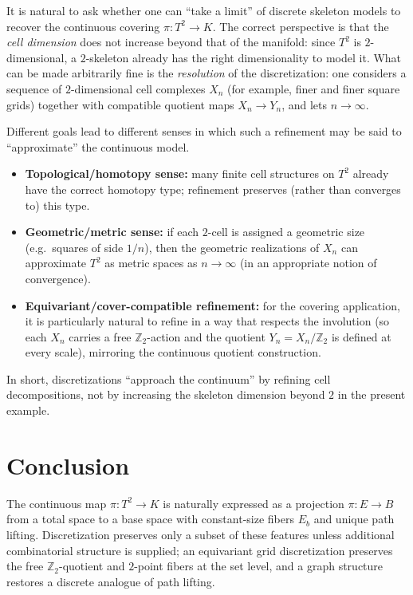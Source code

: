 \documentclass[11pt,a4paper]{article}
\theoremstyle{definition}
\theoremstyle{remark}
\begin{document}
It is natural to ask whether one can ``take a limit'' of discrete skeleton models to recover the continuous covering \(\pi:T^2\to K\). The correct perspective is that the \emph{cell dimension} does not increase beyond that of the manifold: since \(T^2\) is \(2\)-dimensional, a \(2\)-skeleton already has the right dimensionality to model it. What can be made arbitrarily fine is the \emph{resolution} of the discretization: one considers a sequence of \(2\)-dimensional cell complexes \(X_n\) (for example, finer and finer square grids) together with compatible quotient maps \(X_n\to Y_n\), and lets \(n\to\infty\).

Different goals lead to different senses in which such a refinement may be said to ``approximate'' the continuous model.
\begin{itemize}
  \item \textbf{Topological/homotopy sense:} many finite cell structures on \(T^2\) already have the correct homotopy type; refinement preserves (rather than converges to) this type.
  \item \textbf{Geometric/metric sense:} if each \(2\)-cell is assigned a geometric size (e.g.\ squares of side \(1/n\)), then the geometric realizations of \(X_n\) can approximate \(T^2\) as metric spaces as \(n\to\infty\) (in an appropriate notion of convergence).
  \item \textbf{Equivariant/cover-compatible refinement:} for the covering application, it is particularly natural to refine in a way that respects the involution (so each \(X_n\) carries a free \(\mathbb{Z}_2\)-action and the quotient \(Y_n=X_n/\mathbb{Z}_2\) is defined at every scale), mirroring the continuous quotient construction.
\end{itemize}
In short, discretizations ``approach the continuum'' by refining cell decompositions, not by increasing the skeleton dimension beyond \(2\) in the present example.

\section{Conclusion}
\label{sec:conclusion}

The continuous map \(\pi:T^2\to K\) is naturally expressed as a projection \(\pi:E\to B\) from a total space to a base space with constant-size fibers \(E_b\) and unique path lifting. Discretization preserves only a subset of these features unless additional combinatorial structure is supplied; an equivariant grid discretization preserves the free \(\mathbb{Z}_2\)-quotient and \(2\)-point fibers at the set level, and a graph structure restores a discrete analogue of path lifting.
\end{document}
